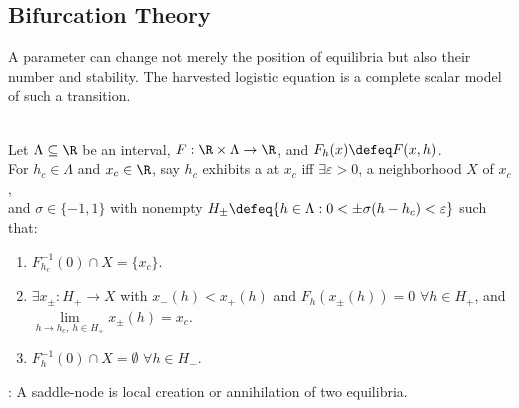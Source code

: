 \subsection{Bifurcation Theory}

A parameter can change not merely the position of equilibria but also their number and stability. The harvested logistic equation is a complete scalar model of such a transition.

\begin{definition} \label{def:scalar-saddle-node-pattern} \\
Let $\Lambda\subseteq\R$ be an interval, $F:\R\times\Lambda\to\R$, and $F_h(x)\defeq F(x,h)$.\\
For $h_c\in\Lambda$ and $x_c\in\R$, say $h_c$ exhibits a  at $x_c$ iff $\exists\varepsilon>0$, a neighborhood $X$ of $x_c$,\\
and $\sigma\in\{-1,1\}$ with nonempty $H_\pm\defeq\{h\in\Lambda:0<\pm\sigma(h-h_c)<\varepsilon\}$ such that:
\begin{enumerate}[label=(\roman*)]
\setlength{\itemsep}{0pt}
\item $F_{h_c}^{-1}(0)\cap X=\{x_c\}$.
\item $\exists x_\pm:H_+\to X$ with $x_-(h)<x_+(h)$ and $F_h(x_\pm(h))=0$ $\forall h\in H_+$, and $\lim\limits_{h\to h_c,\ h\in H_+}x_\pm(h)=x_c$.
\item $F_h^{-1}(0)\cap X=\emptyset$ $\forall h\in H_-$.
\end{enumerate}
: A saddle-node is local creation or annihilation of two equilibria.
\end{definition}

